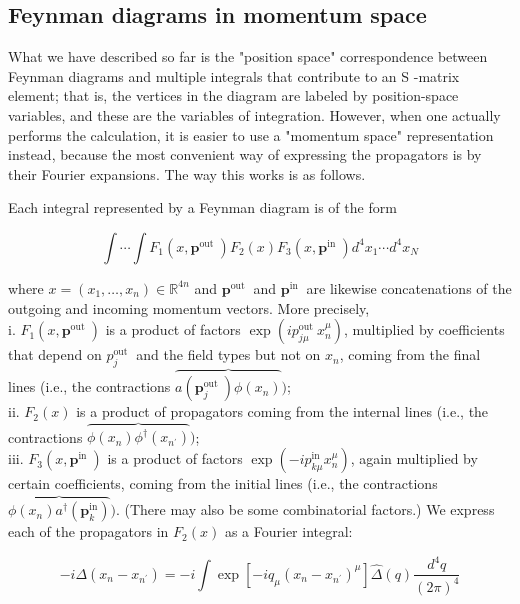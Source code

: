\documentclass[10pt, letterpaper]{article}
\begin{document}
\subsection*{Feynman diagrams in momentum space}
What we have described so far is the "position space" correspondence between Feynman diagrams and multiple integrals that contribute to an S -matrix element; that is, the vertices in the diagram are labeled by position-space variables, and these are the variables of integration. However, when one actually performs the calculation, it is easier to use a "momentum space" representation instead, because the most convenient way of expressing the propagators is by their Fourier expansions. The way this works is as follows.

Each integral represented by a Feynman diagram is of the form

$$
\int \cdots \int F_{1}\left(x, \mathbf{p}^{\text {out }}\right) F_{2}(x) F_{3}\left(x, \mathbf{p}^{\text {in }}\right) d^{4} x_{1} \cdots d^{4} x_{N}
$$

where $x=\left(x_{1}, \ldots, x_{n}\right) \in \mathbb{R}^{4 n}$ and $\mathbf{p}^{\text {out }}$ and $\mathbf{p}^{\text {in }}$ are likewise concatenations of the outgoing and incoming momentum vectors. More precisely,\\
i. $F_{1}\left(x, \mathbf{p}^{\text {out }}\right)$ is a product of factors $\exp \left(i p_{j \mu}^{\text {out }} x_{n}^{\mu}\right)$, multiplied by coefficients that depend on $p_{j}^{\text {out }}$ and the field types but not on $x_{n}$, coming from the final lines (i.e., the contractions $\overbrace{a\left(\mathbf{p}_{j}^{\text {out }}\right) \phi\left(x_{n}\right)})$;\\
ii. $F_{2}(x)$ is a product of propagators coming from the internal lines (i.e., the contractions $\overbrace{\phi\left(x_{n}\right) \phi^{\dagger}\left(x_{n^{\prime}}\right)})$;\\
iii. $F_{3}\left(x, \mathbf{p}^{\text {in }}\right)$ is a product of factors $\exp \left(-i p_{k \mu}^{\text {in }} x_{n}^{\mu}\right)$, again multiplied by certain coefficients, coming from the initial lines (i.e., the contractions $\overbrace{\phi\left(x_{n}\right) a^{\dagger}\left(\mathbf{p}_{k}^{\mathrm{in}}\right)})$. (There may also be some combinatorial factors.) We express each of the propagators in $F_{2}(x)$ as a Fourier integral:

$$
-i \Delta\left(x_{n}-x_{n^{\prime}}\right)=-i \int \exp \left[-i q_{\mu}\left(x_{n}-x_{n^{\prime}}\right)^{\mu}\right] \widehat{\Delta}(q) \frac{d^{4} q}{(2 \pi)^{4}}
$$
\end{document}
